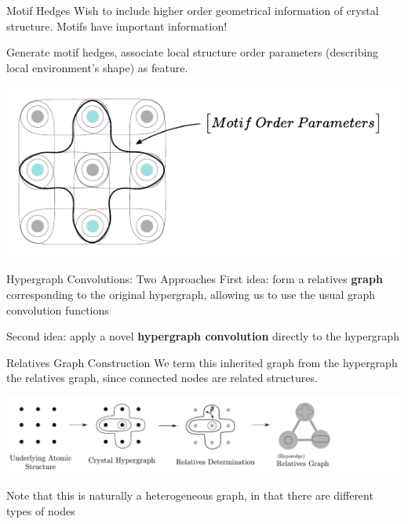 \documentclass[11pt]{beamer}
\begin{document}
\begin{frame}{Motif Hedges}
Wish to include higher order geometrical information of crystal structure. Motifs have important information!

\vspace{0.5cm}\pause

Generate motif hedges, associate local structure order parameters (describing local environment's shape) as feature.

\vspace{0.5cm}

\begin{center}
\includegraphics[scale=0.73]{motif.pdf}
\end{center}
\end{frame}


\begin{frame}{Hypergraph Convolutions: Two Approaches}
First idea: form a relatives \textbf{graph} corresponding to the original hypergraph, allowing us to use the usual graph convolution functions

\vspace{2cm}

Second idea: apply a novel \textbf{hypergraph convolution} directly to the hypergraph

\end{frame}

\begin{frame}{Relatives Graph Construction}
We term this inherited graph from the hypergraph the relatives graph, since connected nodes are related structures.
\begin{center}
\includegraphics[scale=0.33]{relgraph_workflow_horiz.pdf}
\end{center}

Note that this is naturally a heterogeneous graph, in that there are different types of nodes
\end{frame}
\end{document}
